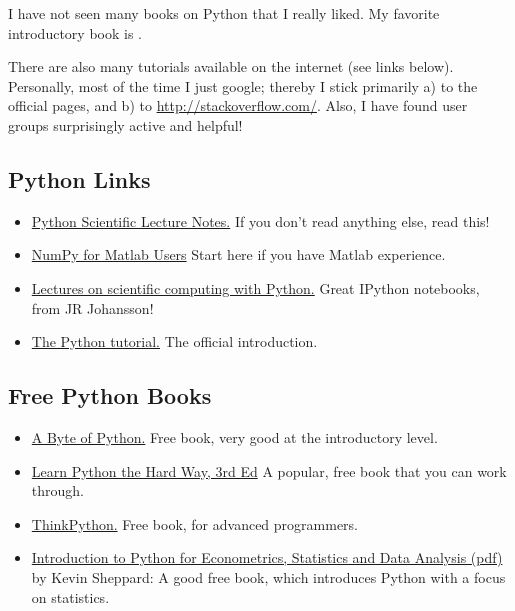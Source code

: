 I have not seen many books on Python that I really liked. My favorite introductory book is \cite{Harms2010}.

There are also many tutorials available on the internet (see links below). Personally, most of the time I just google; thereby I stick primarily a) to the official pages, and b) to \url{http://stackoverflow.com/}. Also, I have found user groups surprisingly active and helpful!

\subsection{Python Links}

\begin{itemize}
  \item  \href{http://scipy-lectures.github.com}{Python Scientific Lecture Notes.} If you don't read anything else, read this!
  \item \href{http://www.scipy.org/NumPy\_for\_Matlab\_Users}{NumPy for Matlab Users} Start here if you have Matlab experience.
  \item \href{https://github.com/jrjohansson/scientific-python-lectures}{Lectures on scientific computing with Python.} Great IPython notebooks, from JR Johansson!
  \item \href{http://docs.python.org/2/tutorial}{The Python tutorial.} The official introduction.
\end{itemize}

\subsection{Free Python Books}

\begin{itemize}
  \item \href{http://swaroopch.com/notes/python}{A Byte of Python.} Free book, very good at the introductory level.
  \item \href{http://learnpythonthehardway.org/book/}{Learn Python the Hard Way, 3rd Ed} A popular, free book that you can work through.
  \item \href{http://www.greenteapress.com/thinkpython}{ThinkPython.} Free book, for advanced programmers.
  \item \href{http://www.kevinsheppard.com/images/0/09/Python_introduction.pdf}{Introduction to
      Python for Econometrics, Statistics and Data Analysis (pdf)} by Kevin Sheppard: A
      good free book, which introduces Python with a focus on statistics.
\end{itemize}

